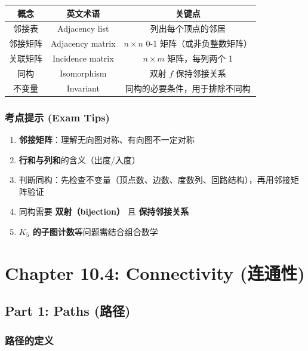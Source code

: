 \documentclass[10pt,a4paper,openany]{ctexbook}
\theoremstyle{definition}
\theoremstyle{remark}
\begin{document}
\begin{center}
\begin{tabular}{ccc}
\hline
概念 & 英文术语 & 关键点 \\ \hline
邻接表 & Adjacency list & 列出每个顶点的邻居 \\
邻接矩阵 & Adjacency matrix & $n \times n$ 0-1 矩阵（或非负整数矩阵） \\
关联矩阵 & Incidence matrix & $n \times m$ 矩阵，每列两个 1 \\
同构 & Isomorphism & 双射 $f$ 保持邻接关系 \\
不变量 & Invariant & 同构的必要条件，用于排除不同构 \\
\hline
\end{tabular}

\end{center}

\subsubsection{考点提示 (Exam Tips)}

\begin{enumerate}
\item \textbf{邻接矩阵}：理解无向图对称、有向图不一定对称
\item \textbf{行和与列和}的含义（出度/入度）
\item 判断同构：先检查不变量（顶点数、边数、度数列、回路结构），再用邻接矩阵验证
\item 同构需要 \textbf{双射（bijection）} 且 \textbf{保持邻接关系}
\item \textbf{$K_5$ 的子图计数}等问题需结合组合数学

\end{enumerate}


\section{Chapter 10.4: Connectivity (连通性)}

\vspace{-2pt}

\subsection{Part 1: Paths (路径)}

\subsubsection{路径的定义}
\end{document}
